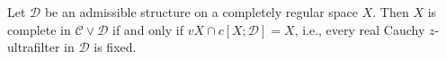 Let $\mathcal{D}$ be an admissible structure on a completely regular space $X$. Then $X$ is complete in $\mathcal{C} \vee \mathcal{D}$ if and only if $vX \cap c[X; \mathcal{D}] = X$, i.e., every real Cauchy $z$-ultrafilter in $\mathcal{D}$ is fixed.
